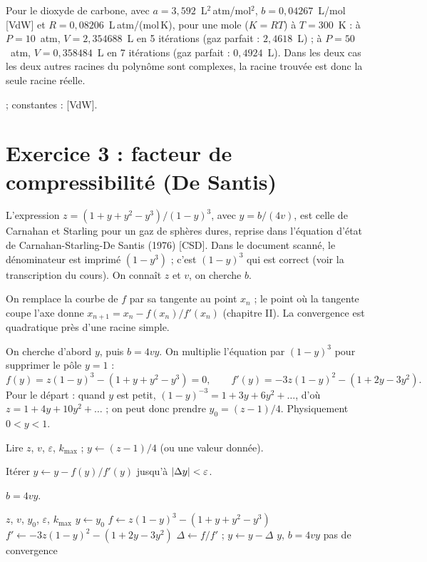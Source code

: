 \Verif Pour le dioxyde de carbone, avec $a = 3{,}592$~L$^2$\,atm/mol$^2$,
$b = 0{,}04267$~L/mol [VdW] et $R = 0{,}08206$~L\,atm/(mol\,K), pour une mole
($K = RT$) à $T = 300$~K : à $P = 10$~atm, $V = 2{,}354688$~L en 5 itérations
(gaz parfait : $2{,}4618$~L) ; à $P = 50$~atm, $V = 0{,}358484$~L en 7
itérations (gaz parfait : $0{,}4924$~L). Dans les deux cas les deux autres
racines du polynôme sont complexes, la racine trouvée est donc la seule racine
réelle.

\Refs {} ; constantes : [VdW].

\section{Exercice 3 : facteur de compressibilité (De Santis)}

\Attention L'expression $z = (1 + y + y^2 - y^3)/(1 - y)^3$, avec
$y = b/(4v)$, est celle de Carnahan et Starling pour un gaz de sphères dures,
reprise dans l'équation d'état de Carnahan-Starling-De Santis (1976) [CSD].
Dans le document scanné, le dénominateur est imprimé $(1 - y^3)$ ; c'est
$(1 - y)^3$ qui est correct (voir la transcription du cours). On connaît $z$
et $v$, on cherche $b$.

\Pourquoi On remplace la courbe de $f$ par sa tangente au point $x_n$ ; le point
où la tangente coupe l'axe donne $x_{n+1} = x_n - f(x_n)/f'(x_n)$ (chapitre II).
La convergence est quadratique près d'une racine simple.

\Pourquoi On cherche d'abord $y$, puis $b = 4vy$. On multiplie l'équation par
$(1 - y)^3$ pour supprimer le pôle $y = 1$ :
\[
  f(y) = z(1 - y)^3 - (1 + y + y^2 - y^3) = 0, \qquad
  f'(y) = -3z(1 - y)^2 - (1 + 2y - 3y^2) .
\]
Pour le départ : quand $y$ est petit, $(1 - y)^{-3} = 1 + 3y + 6y^2 + \dots$,
d'où $z = 1 + 4y + 10y^2 + \dots$ ; on peut donc prendre $y_0 = (z - 1)/4$.
Physiquement $0 < y < 1$.

\Etapes
{} Lire $z$, $v$, $\varepsilon$, $k_{\max}$ ; $y \leftarrow (z - 1)/4$
(ou une valeur donnée).

 Itérer $y \leftarrow y - f(y)/f'(y)$ jusqu'à
$\left|\Delta y\right| < \varepsilon$.

 $b = 4vy$.

\begin{algo}[ : De Santis]
  \Read $z$, $v$, $y_0$, $\varepsilon$, $k_{\max}$
  \State $y \leftarrow y_0$
    \State $f \leftarrow z(1-y)^3 - (1 + y + y^2 - y^3)$
    \State $f' \leftarrow -3z(1-y)^2 - (1 + 2y - 3y^2)$
    \State $\Delta \leftarrow f/f'$ ; $y \leftarrow y - \Delta$
    \If{$\abs{\Delta} < \varepsilon$} \Print $y$, $b = 4vy$ \Stop \EndIf
  \EndFor
  \Print \og pas de convergence \fg{}
\end{algo}

